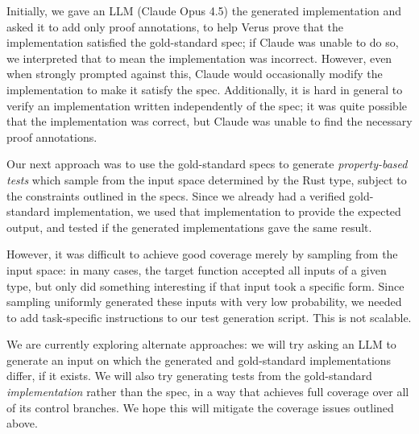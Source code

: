 Initially, we gave an LLM (Claude Opus 4.5) 
the generated implementation and asked it to add only proof annotations, 
to help Verus prove that the implementation satisfied the gold-standard spec;
if Claude was unable to do so, we interpreted that to mean the implementation was incorrect.
However, even when strongly prompted against this, 
Claude would occasionally modify the implementation to make it satisfy the spec.
Additionally, it is hard in general to verify an implementation written independently of the spec;
it was quite possible that the implementation was correct, 
but Claude was unable to find the necessary proof annotations. 

Our next approach was to use the gold-standard specs to generate \emph{property-based tests}
which sample from the input space determined by the Rust type, 
subject to the constraints outlined in the specs.
Since we already had a verified gold-standard implementation, 
we used that implementation to provide the expected output,
and tested if the generated implementations gave the same result. 

However, it was difficult to achieve good coverage merely by sampling from the input space:
in many cases, the target function accepted all inputs of a given type,
but only did something interesting if that input took a specific form. 
Since sampling uniformly generated these inputs with very low probability,
we needed to add task-specific instructions to our test generation script.
This is not scalable.

We are currently exploring alternate approaches:
we will try asking an LLM to generate an input on which the generated
and gold-standard implementations differ, if it exists.
We will also try generating tests from the gold-standard \emph{implementation} rather than the spec,
in a way that achieves full coverage over all of its control branches.
We hope this will mitigate the coverage issues outlined above.